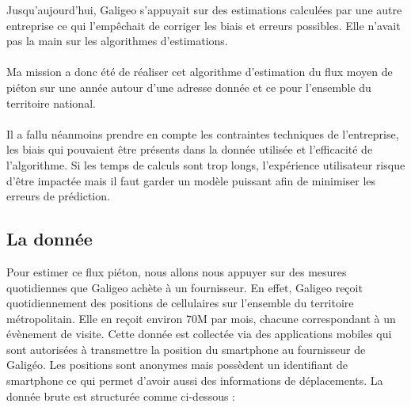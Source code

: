 Jusqu’aujourd’hui, Galigeo s’appuyait sur des estimations calculées par une autre entreprise ce qui l’empêchait de corriger les biais et erreurs possibles. Elle n’avait pas la main sur les algorithmes d’estimations.

\paragraph*{}

Ma mission a donc été de réaliser cet algorithme d’estimation du flux moyen de piéton sur une année autour d’une adresse donnée et ce pour l'ensemble du territoire national.

\paragraph{}

Il a fallu néanmoins prendre en compte les contraintes techniques de l’entreprise, les biais qui pouvaient être présents dans la donnée utilisée et l’efficacité de l’algorithme. Si les temps de calculs sont trop longs, l’expérience utilisateur risque d’être impactée mais il faut garder un modèle puissant afin de minimiser les erreurs de prédiction.

\subsection{La donnée}

Pour estimer ce flux piéton, nous allons nous appuyer sur des mesures quotidiennes que Galigeo achète à un fournisseur. En effet, Galigeo reçoit quotidiennement des positions de cellulaires sur l'ensemble du territoire métropolitain. Elle en reçoit environ 70M par mois, chacune correspondant à un évènement de visite. Cette donnée est collectée via des applications mobiles qui sont autorisées à transmettre la position du smartphone au fournisseur de Galigéo. Les positions sont anonymes mais possèdent un identifiant de smartphone ce qui permet d'avoir aussi des informations de déplacements. La donnée brute est structurée comme ci-dessous :

